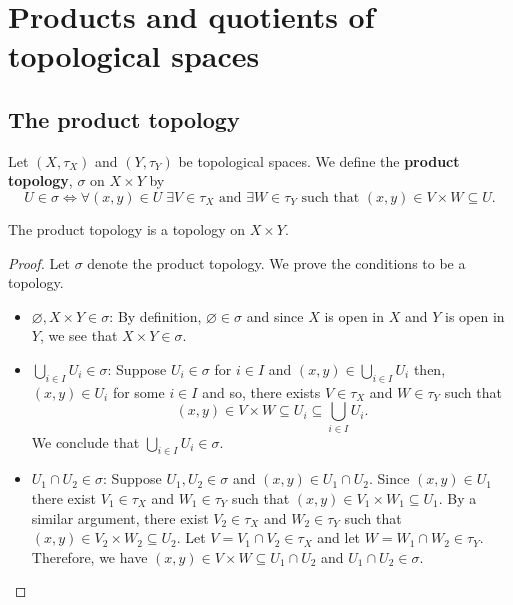 \documentclass[12pt, a4paper]{article}
\begin{document}
\section{Products and quotients of topological spaces}

\subsection{The product topology}

\begin{definition}
    Let \((X,\tau_X)\) and \((Y,\tau_Y)\) be topological spaces. We define the \textbf{product topology}, \(\sigma\) on \(X \times Y\) by 
    \[U \in \sigma \iff \forall (x,y) \in U \; \exists V \in \tau_X \text{ and } \exists W \in \tau_Y \text{ such that } (x,y) \in V \times W \subseteq U.\]
\end{definition}

\begin{proposition}
    The product topology is a topology on \(X \times Y\).
\end{proposition}

\begin{proof}
    Let \(\sigma\) denote the product topology. We prove the conditions to be a topology.
    \begin{itemize}
        \item \(\varnothing, X \times Y \in \sigma\):
        By definition, \(\varnothing \in \sigma\) and since \(X\) is open in \(X\) and \(Y\) is open in \(Y\), we see that \(X \times Y \in \sigma\).
        \item \(\bigcup_{i \in I} U_i \in \sigma\):
        Suppose \(U_i \in \sigma\) for \(i \in I\) and \((x,y) \in \bigcup_{i \in I} U_i\) then, \((x,y) \in U_i\) for some \(i \in I\) and so, there exists \(V \in \tau_X\) and \(W \in \tau_Y\) such that 
        \[(x,y) \in V \times W \subseteq U_i \subseteq \bigcup_{i \in I} U_i.\]
        We conclude that \(\bigcup_{i \in I} U_i \in \sigma\).
        \item \(U_1 \cap U_2 \in \sigma\):
        Suppose \(U_1, U_2 \in \sigma\) and \((x,y) \in U_1 \cap U_2\). Since \((x,y) \in U_1\) there exist \(V_1 \in \tau_X\) and \(W_1 \in \tau_Y\) such that \((x,y) \in V_1 \times W_1 \subseteq U_1\). By a similar argument, there exist \(V_2 \in \tau_X\) and \(W_2 \in \tau_Y\) such that \((x,y) \in V_2 \times W_2 \subseteq U_2\). Let \(V=V_1 \cap V_2 \in \tau_X\) and let \(W = W_1 \cap W_2 \in \tau_Y\). Therefore, we have \((x,y) \in V \times W \subseteq U_1 \cap U_2\) and \(U_1 \cap U_2 \in \sigma\).
    \end{itemize} 
\end{proof}
\end{document}

